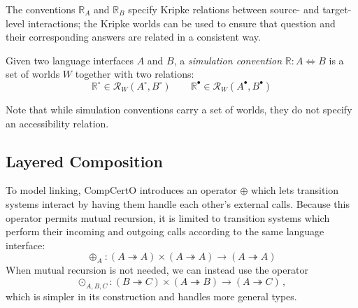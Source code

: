 \documentclass[acmsmall,screen,review,anonymous]{acmart}
\newcommand{\que}{\circ}
\newcommand{\ans}{\bullet}
\begin{document}
The conventions $\mathbb{R}_A$ and $\mathbb{R}_B$
specify Kripke relations between source- and target-level interactions;
the Kripke worlds can be used to ensure that
question and their corresponding answers
are related in a consistent way.

\begin{definition} \label{def:simconv}
Given two language interfaces $A$ and $B$,
a \emph{simulation convention} $\mathbb{R} : A \Leftrightarrow B$
is a set of worlds $W$ together with two relations:
\[
  \mathbb{R}^\que \in \mathcal{R}_W(A^\que, B^\que)
  \qquad
  \mathbb{R}^\ans \in \mathcal{R}_W(A^\ans, B^\ans)
\]
\end{definition}

Note that while simulation conventions
carry a set of worlds,
they do not specify an accessibility relation.

\begin{definition} \label{def:sim}
\end{definition}

\begin{definition} \label{def:ccomp}
\end{definition}

\begin{theorem} \label{thm:vcomp}
\end{theorem}



\subsection{Layered Composition} \label{sec:basic:lcomp} %

To model linking,
CompCertO introduces an operator $\oplus$
which lets transition systems interact
by having them handle each other's external calls.
Because this operator permits mutual recursion,
it is limited to transition systems which perform
their incoming and outgoing calls
according to the same language interface:
\[
  {\oplus_A} :
    (A \twoheadrightarrow A) \times
    (A \twoheadrightarrow A) \rightarrow
    (A \twoheadrightarrow A)
\]
When mutual recursion is not needed,
we can instead use the operator
\[
  {\odot_{A,B,C}} :
    (B \twoheadrightarrow C) \times
    (A \twoheadrightarrow B) \rightarrow
    (A \twoheadrightarrow C)
  \,,
\]
which is simpler in its construction
and handles more general types.
\end{document}
